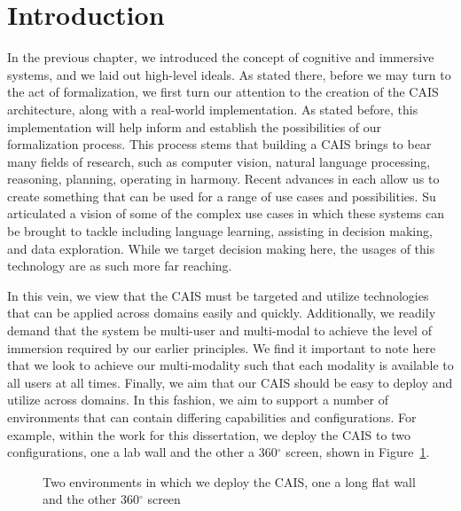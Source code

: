 \section{Introduction}

In the previous chapter, we introduced the concept of cognitive and immersive
systems, and we laid out high-level ideals. As stated there, before we may turn
to the act of formalization, we first turn our attention to the creation of
the CAIS architecture, along with a real-world implementation. As stated before,
this implementation will help inform and establish the possibilities of our
formalization process. This process stems that building a CAIS brings to bear
many fields of research, such as computer vision, natural language processing,
reasoning, planning, operating in harmony. Recent advances in each allow us
to create something that can be used for a range of use cases and possibilities.
Su~\cite{su_cognitive_2017} articulated a vision of some of the complex use
cases in which these systems can be brought to tackle including language
learning, assisting in decision making, and data exploration. While we target
decision making here, the usages of this technology are as such more far reaching.

In this vein, we view that the CAIS must be targeted and utilize technologies
that can be applied across domains easily and quickly. Additionally, we readily
demand that the system be multi-user and multi-modal to achieve the level of
immersion required by our earlier principles. We find it important to note here
that we look to achieve our multi-modality such that each modality is available
to all users at all times. Finally, we aim that our CAIS should be easy to deploy
and utilize across domains. In this fashion, we aim to support a number of
environments that can contain differing capabilities and configurations. For
example, within the work for this dissertation, we deploy the CAIS to two
configurations, one a lab wall and the other a 360$^{\circ}$ screen, shown in
Figure~\ref{fig:cais_environments}. 

\begin{figure}
\centering
    \hfill
    \hfill
    \hfill
  \caption{Two environments in which we deploy the CAIS, one a long flat wall and the other 360$^{\circ}$ screen}
  \label{fig:cais_environments}
\end{figure}